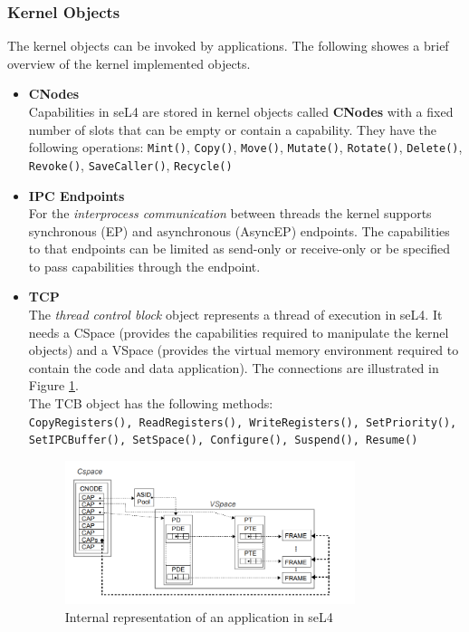 \documentclass[pdftex,12pt,a4paper]{article}
\begin{document}
	\subsubsection{Kernel Objects}
	The kernel objects can be invoked by applications. The following showes a brief overview of the kernel implemented objects. 
	\begin{itemize}
	\item \textbf{CNodes} \\
	Capabilities in seL4 are stored in kernel objects called \textbf{CNodes} with a fixed number of slots that can be empty or contain a capability. They have the following operations:
	\texttt{Mint()}, \texttt{Copy()}, \texttt{Move()}, \texttt{Mutate()}, \texttt{Rotate()}, \texttt{Delete()}, \texttt{Revoke()}, \texttt{SaveCaller()}, \texttt{Recycle()}
	\item \textbf{IPC Endpoints} \\
	For the \textit{interprocess communication} between threads the kernel supports synchronous (EP) and asynchronous (AsyncEP) endpoints. The capabilities to that endpoints can be limited as send-only or receive-only or be specified to pass capabilities through the endpoint.  
	\item \textbf{TCP} \\
	The \textit{thread control block} object represents a thread of execution in seL4. It needs a CSpace (provides the capabilities required to manipulate the kernel objects) and a VSpace (provides the virtual memory environment required to contain the code and data application). The connections are illustrated in Figure \ref{fig:intapp}. \\
	The TCB object has the following methods: \\
	\texttt{CopyRegisters(), ReadRegisters(), WriteRegisters(), SetPriority(), SetIPCBuffer(), SetSpace(), Configure(), Suspend(), Resume()}
	
	\begin{figure}[ht]
	\centering
		\includegraphics[width=0.8\textwidth]{./applicationIntern.png}
	\caption[Internal repersentation of application]{Internal representation of an application in seL4 \citep{sel4}}
	\label{fig:intapp}
	\end{figure}
	

\end{itemize}
\end{document}
